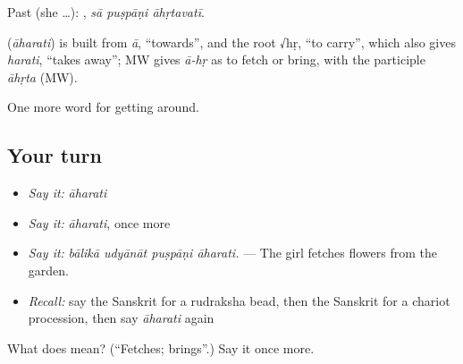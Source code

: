 Past (she …):   , \emph{sā puṣpāṇi āhṛtavatī}.

\begin{cousinweb}
\textbf{} (\emph{āharati}) is built from \emph{ā}, \textquotedblleft{}towards\textquotedblright{}, and the root √hṛ, \textquotedblleft{}to carry\textquotedblright{}, which also gives \emph{harati}, \textquotedblleft{}takes away\textquotedblright{}; MW gives \emph{ā-hṛ} as to fetch or bring, with the participle \emph{āhṛta} (MW).
\end{cousinweb}

\begin{grammarlens}[title={What you've built}]
One more word for getting around.
\end{grammarlens}

\subsection*{Your turn}
\begin{itemize}
\raggedright
  \item \emph{Say it:} \emph{āharati}
  \item \emph{Say it:} \emph{āharati}, once more
  \item \emph{Say it:} \emph{bālikā udyānāt puṣpāṇi āharati.} — The girl fetches flowers from the garden.
  \item \emph{Recall:} say the Sanskrit for a rudraksha bead, then the Sanskrit for a chariot procession, then say \emph{āharati} again
\end{itemize}

\begin{tcolorbox}[breakable,colback=teal!4,colframe=teal!35!black,title={Before you move on}]
What does  mean? (\textquotedblleft{}Fetches; brings\textquotedblright{}.) Say it once more.
\end{tcolorbox}
